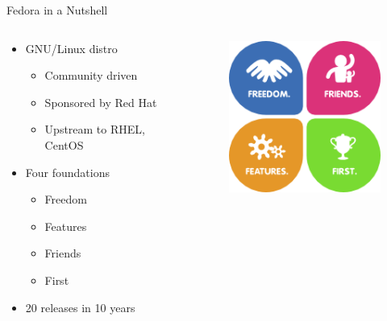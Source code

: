 \documentclass{beamer}
\begin{document}
\begin{frame}{Fedora in a Nutshell}
  \begin{columns}
    \begin{column}{.5\textwidth}
  \begin{itemize}
    \item GNU/Linux distro
      \begin{itemize}
        \item Community driven
        \item Sponsored by Red Hat
        \item Upstream to RHEL, CentOS
      \end{itemize}
    \item Four foundations
      \begin{itemize}
        \item Freedom
        \item Features
        \item Friends
        \item First
      \end{itemize}
    \item 20 releases in 10 years
  \end{itemize}
    \end{column}
    \begin{column}{.5\textwidth}
      \begin{figure}[htbp]
        \centering
        \includegraphics[width=.6\textwidth]{4Foundations.png}
      \end{figure}
    \end{column}
  \end{columns}
\end{frame}
\end{document}
